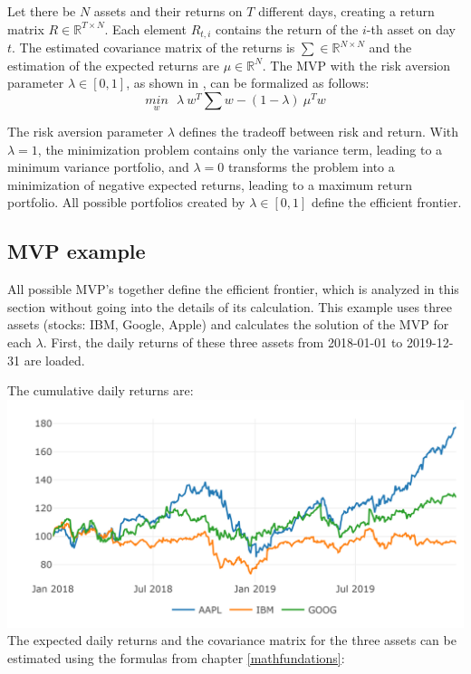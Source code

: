 \documentclass[
  oneside]{book}
\begin{document}
Let there be \(N\) assets and their returns on \(T\) different days, creating a return matrix \(R \in \mathbb{R}^{T \times N}\). Each element \(R_{t,i}\) contains the return of the \(i\)-th asset on day \(t\). The estimated covariance matrix of the returns is \(\textstyle\sum \in \mathbb{R}^{N \times N}\) and the estimation of the expected returns are \(\mu \in \mathbb{R}^{N}\). The MVP with the risk aversion parameter \(\lambda \in [0,1]\), as shown in \citep{Mari2005}, can be formalized as follows:
\begin{equation} 
\underset{w}{min} \ \ \ \lambda \ w^T \textstyle\sum w - (1-\lambda) \ \mu^T w
\label{eq:MVP}
\end{equation}

The risk aversion parameter \(\lambda\) defines the tradeoff between risk and return. With \(\lambda = 1\), the minimization problem contains only the variance term, leading to a minimum variance portfolio, and \(\lambda = 0\) transforms the problem into a minimization of negative expected returns, leading to a maximum return portfolio. All possible portfolios created by \(\lambda \in [0, 1]\) define the efficient frontier.

\hypertarget{mvp-example}{%
\subsection{MVP example}\label{mvp-example}}

All possible MVP's together define the efficient frontier, which is analyzed in this section without going into the details of its calculation. This example uses three assets (stocks: IBM, Google, Apple) and calculates the solution of the MVP for each \(\lambda\). First, the daily returns of these three assets from 2018-01-01 to 2019-12-31 are loaded.

The cumulative daily returns are:\\
\includegraphics{Master_Thesis_files/figure-latex/MVP_ex2-1.png}
The expected daily returns and the covariance matrix for the three assets can be estimated using the formulas from chapter \ref{mathfundations}:
\end{document}
